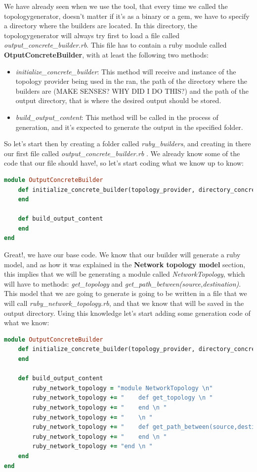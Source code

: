 We have already seen when we use the tool, that every time we called the topologygenerator, doesn't matter if it's as a binary or a gem, we have to specify a directory where the builders are located. In this directory, the topologygenerator will always try first to load a file called \textit{output\_concrete\_builder.rb}. This file has to contain a ruby module called \textbf{OtputConcreteBuilder}, with at least the following two methods: 
\begin{itemize}
\item \textit{initialize\_concrete\_builder}: This method will receive and instance of the topology provider being used in the ran, the path of the directory where the builders are (MAKE SENSES? WHY DID I DO THIS?) and the path of the output directory, that is where the desired output should be stored.
\item \textit{build\_output\_content}: This method will be called in the process of generation, and it's expected to generate the output in the specified folder.
\end{itemize}

So let's start then by creating a folder called \textit{ruby\_builders}, and creating in there our first file called \textit{output\_concrete\_builder.rb} . We already know some of the code that our file should have!, so let's start coding what we know up to know:

\begin{lstlisting}[language=Ruby,breaklines=true]
module OutputConcreteBuilder
	def initialize_concrete_builder(topology_provider, directory_concrete_builders, output_directory)
	end
    
    def build_output_content
    end
end
\end{lstlisting}

Great!, we have our base code. We know that our builder will generate a ruby model, and as how it was explained in the \textbf{Network topology model} section, this implies that we will be generating a module called \textit{NetworkTopology}, which will have to methods: \textit{get\_topology} and \textit{get\_path\_between(source,destination)}. This model that we are going to generate is going to be written in a file that we will call \textit{ruby\_network\_topology.rb}, and that we know that will be saved in the output directory. Using this knowledge let's start adding some generation code of what we know:

\begin{lstlisting}[language=Ruby,breaklines=true]
module OutputConcreteBuilder
	def initialize_concrete_builder(topology_provider, directory_concrete_builders, output_directory)
	end
    
    def build_output_content
    	ruby_network_topology = "module NetworkTopology \n"
    	ruby_network_topology += "    def get_topology \n "
    	ruby_network_topology += "    end \n "
    	ruby_network_topology += "    \n "
    	ruby_network_topology += "    def get_path_between(source,destination) \n "
    	ruby_network_topology += "    end \n "
    	ruby_network_topology += "end \n "
    end
end
\end{lstlisting}

